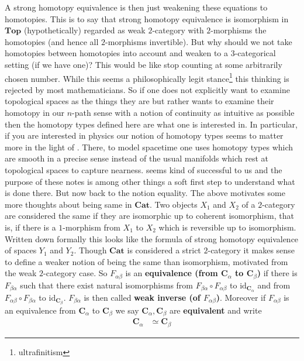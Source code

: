 A strong homotopy equivalence is then just weakening these equations to homotopies. This is to say that strong homotopy equivalence is isomorphism in $\mathbf{Top}$ (hypothetically) regarded as weak $2$-category with $2$-morphisms the homotopies (and hence all $2$-morphisms invertible). But why should we not take homotopies between homotopies into account and weaken to a $3$-categorical setting (if we have one)? This would be like stop counting at some arbitrarily chosen number. While this seems a philosophically legit stance\footnote{ultrafinitism} this thinking is rejected by most mathematicians. So if one does not explicitly want to examine topological spaces as the things they are but rather wants to examine their homotopy in our $n$-path sense with a notion of continuity as intuitive as possible then the homotopy types defined here are what one is interested in. In particular, if you are interested in physics our notion of homotopy types seems to matter more in the light of \cite{a565d200}. There, to model spacetime one uses homotopy types which are smooth in a precise sense instead of the usual manifolds which rest at topological spaces to capture nearness. \cite{a565d200} seems kind of successful to us and the purpose of these notes is among other things a soft first step to understand what is done there. But now back to the notion equality. The above motivates some more thoughts about {\glqq}being same{\grqq} in $\mathbf{Cat}$. Two objects $X_{1}$ and $X_{2}$ of a $2$-category are considered the same if they are isomorphic up to coherent isomorphism, that is, if there is a $1$-morphism from $X_{1}$ to $X_{2}$ which is reversible up to isomorphism. Written down formally this looks like the formula of strong homotopy equivalence of spaces $Y_{1}$ and $Y_{2}$. Though $\mathbf{Cat}$ is considered a strict $2$-category it makes sense to define a weaker notion of being the same than isomorphism, motivated from the weak $2$-category case. So $F_{\alpha\beta}$ is an \textbf{equivalence (from $\mathbf{C}_{\alpha}$ to $\mathbf{C}_{\beta}$)} if there is $F_{\beta\alpha}$ such that there exist natural isomorphisms from $F_{\beta\alpha} \circ F_{\alpha\beta}$ to $\mathrm{id}_{\mathbf{C}_{\alpha}}$ and from $F_{\alpha\beta} \circ F_{\beta\alpha}$ to $\mathrm{id}_{\mathbf{C}_{\beta}}$. $F_{\beta\alpha}$ is then called \textbf{weak inverse (of $F_{\alpha\beta}$)}. Moreover if $F_{\alpha\beta}$ is an equivalence from $\mathbf{C}_{\alpha}$ to $\mathbf{C}_{\beta}$ we say $\mathbf{C}_{\alpha},\mathbf{C}_{\beta}$ are \textbf{equivalent} and write
\begin{align*}
  \mathbf{C}_{\alpha}
  &\simeq
  \mathbf{C}_{\beta}
\end{align*}
